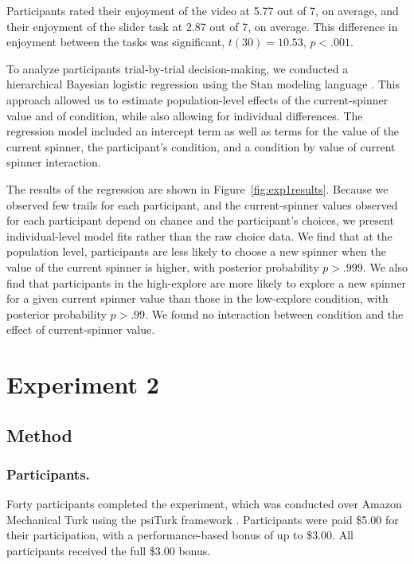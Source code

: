 \documentclass[10pt,letterpaper]{article}
\begin{document}
Participants rated their enjoyment of the video at 5.77 out of 7, on average,
and their enjoyment of the slider task at 2.87 out of 7, on average. This
difference in enjoyment between the tasks was significant, $t(30)=10.53$, $p<.001$.

To analyze participants trial-by-trial decision-making, we conducted a hierarchical
Bayesian logistic regression using the Stan modeling language \citep{stan-software:2015}.
This approach allowed us to estimate population-level effects of the
current-spinner value and of condition, while also allowing for individual
differences. The regression model included an intercept term as well as terms
for the value of the current spinner, the participant's condition, and a
condition by value of current spinner interaction.

The results of the regression are shown in Figure~\ref{fig:exp1results}.
Because we observed few trails for each participant, and the current-spinner
values observed for each participant depend on chance and the participant's
choices, we present individual-level model fits rather than the raw choice data.
We find that at the population level, participants are less likely to choose a
new spinner when the value of the current spinner is higher, with posterior
probability $p>.999$. We also find that participants in the high-explore are more likely to explore a new spinner for a
given current spinner value than those in the low-explore condition, with
posterior probability $p>.99$. We found no interaction between condition and the
effect of current-spinner value.

\section{Experiment 2}

\subsection{Method}

\subsubsection{Participants.}

Forty participants completed the experiment, which was conducted over
Amazon Mechanical Turk using the psiTurk framework \citep{Gureckis2015a}.
Participants were paid \$5.00 for their participation, with a performance-based
bonus of up to \$3.00. All participants received the full \$3.00 bonus.
\end{document}
